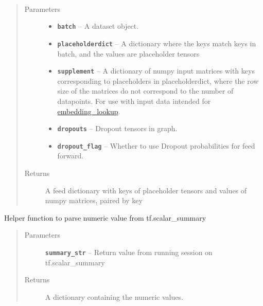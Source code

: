 \documentclass[letterpaper,10pt,english]{sphinxmanual}
\begin{document}
\begin{fulllineitems}
\label{generic_model:generic_model.get_feed_list}~\begin{quote}\begin{description}
\item[{Parameters}] \leavevmode\begin{itemize}
\item {} 
\textbf{\texttt{batch}} -- A dataset object.

\item {} 
\textbf{\texttt{placeholderdict}} -- A dictionary where the keys match keys in batch, and the values are placeholder tensors

\item {} 
\textbf{\texttt{supplement}} -- A dictionary of numpy input matrices with keys corresponding to placeholders in placeholderdict, where the row size of the matrices do not correspond to the number of datapoints. For use with input data intended for \href{https://www.tensorflow.org/versions/r0.7/api\_docs/python/nn.html\#embeddings}{embedding\_lookup}.

\item {} 
\textbf{\texttt{dropouts}} -- Dropout tensors in graph.

\item {} 
\textbf{\texttt{dropout\_flag}} -- Whether to use Dropout probabilities for feed forward.

\end{itemize}

\item[{Returns}] \leavevmode
A feed dictionary with keys of placeholder tensors and values of numpy matrices, paired by key

\end{description}\end{quote}

\end{fulllineitems}


\begin{fulllineitems}
\label{generic_model:generic_model.parse_summary_val}
Helper function to parse numeric value from tf.scalar\_summary
\begin{quote}\begin{description}
\item[{Parameters}] \leavevmode
\textbf{\texttt{summary\_str}} -- Return value from running session on tf.scalar\_summary

\item[{Returns}] \leavevmode
A dictionary containing the numeric values.

\end{description}\end{quote}

\end{fulllineitems}
\end{document}
